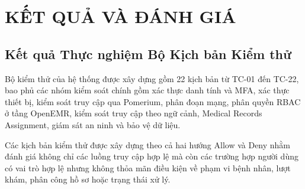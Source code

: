 \section{KẾT QUẢ VÀ ĐÁNH GIÁ}

\subsection{Kết quả Thực nghiệm Bộ Kịch bản Kiểm thử}

Bộ kiểm thử của hệ thống được xây dựng gồm 22 kịch bản từ TC-01 đến TC-22, bao phủ các nhóm kiểm soát chính gồm xác thực danh tính và MFA, xác thực thiết bị, kiểm soát truy cập qua Pomerium, phân đoạn mạng, phân quyền RBAC ở tầng OpenEMR, kiểm soát truy cập theo ngữ cảnh, Medical Records Assignment, giám sát an ninh và bảo vệ dữ liệu.

Các kịch bản kiểm thử được xây dựng theo cả hai hướng Allow và Deny nhằm đánh giá không chỉ các luồng truy cập hợp lệ mà còn các trường hợp người dùng có vai trò hợp lệ nhưng không thỏa mãn điều kiện về phạm vi bệnh nhân, lượt khám, phân công hồ sơ hoặc trạng thái xử lý. 

\begingroup
\setlength\LTleft{0pt}
\setlength\LTright{0pt}

